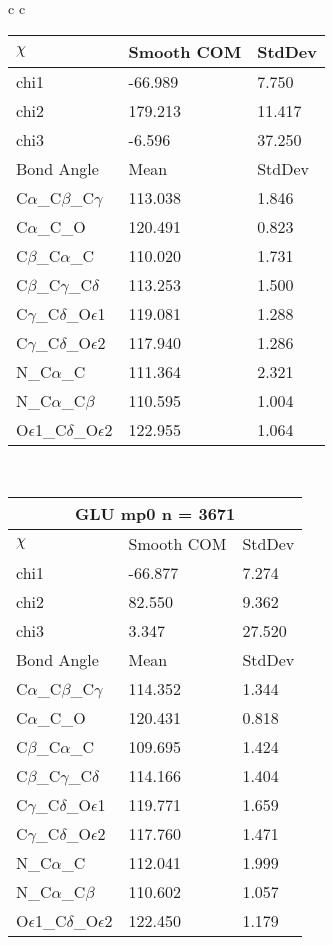 \begin{longtable}{ c c }
\begin{tabular}{ l l l }
  $\chi$       & Smooth COM & StdDev \\ \midrule
  chi1 & -66.989 & 7.750 \\ 
  chi2 & 179.213 & 11.417 \\ 
  chi3 & -6.596 & 37.250 \\ \midrule
  Bond Angle   & Mean     & StdDev \\ \midrule
  C$\alpha$\_C$\beta$\_C$\gamma$ & 113.038 & 1.846\\
  C$\alpha$\_C\_O & 120.491 & 0.823\\
  C$\beta$\_C$\alpha$\_C & 110.020 & 1.731\\
  C$\beta$\_C$\gamma$\_C$\delta$ & 113.253 & 1.500\\
  C$\gamma$\_C$\delta$\_O$\epsilon$1 & 119.081 & 1.288\\
  C$\gamma$\_C$\delta$\_O$\epsilon$2 & 117.940 & 1.286\\
  N\_C$\alpha$\_C & 111.364 & 2.321\\
  N\_C$\alpha$\_C$\beta$ & 110.595 & 1.004\\
  O$\epsilon$1\_C$\delta$\_O$\epsilon$2 & 122.955 & 1.064\\
  \bottomrule
  \end{tabular}
  \\
  \begin{tabular}{ l l l }
  \toprule
  \multicolumn{3}{c}{GLU \textbf{mp0} n = 3671} \\ \toprule
  $\chi$       & Smooth COM & StdDev \\ \midrule
  chi1 & -66.877 & 7.274 \\ 
  chi2 & 82.550 & 9.362 \\ 
  chi3 & 3.347 & 27.520 \\ \midrule
  Bond Angle   & Mean     & StdDev \\ \midrule
  C$\alpha$\_C$\beta$\_C$\gamma$ & 114.352 & 1.344\\
  C$\alpha$\_C\_O & 120.431 & 0.818\\
  C$\beta$\_C$\alpha$\_C & 109.695 & 1.424\\
  C$\beta$\_C$\gamma$\_C$\delta$ & 114.166 & 1.404\\
  C$\gamma$\_C$\delta$\_O$\epsilon$1 & 119.771 & 1.659\\
  C$\gamma$\_C$\delta$\_O$\epsilon$2 & 117.760 & 1.471\\
  N\_C$\alpha$\_C & 112.041 & 1.999\\
  N\_C$\alpha$\_C$\beta$ & 110.602 & 1.057\\
  O$\epsilon$1\_C$\delta$\_O$\epsilon$2 & 122.450 & 1.179\\

\end{tabular}
\end{longtable}
